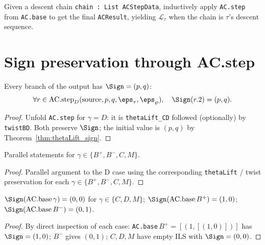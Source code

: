 \begin{definition}
  \label{def:AC_fold}
  \leanok
  Given a descent chain \texttt{chain : List ACStepData}, inductively apply
  \texttt{AC.step} from \texttt{AC.base} to get the final \texttt{ACResult},
  yielding $\mathcal{L}_\tau$ when the chain is $\tau$'s descent sequence.
\end{definition}

\section{Sign preservation through AC.step}

\begin{theorem}[AC.step preserves signature ($\gamma = D$)]
  \label{thm:AC_step_sign_D}
  \leanok
  Every branch of the output has $\Sign = (p, q)$:
  \[ \forall r \in \mathrm{AC.step}_{D}(\mathrm{source}, p, q, \eps_\tau, \eps_\wp),\quad \Sign(r.2) = (p, q). \]
\end{theorem}
\begin{proof}
  \leanok
  Unfold \texttt{AC.step} for $\gamma = D$: it is \texttt{thetaLift\_CD} followed (optionally) by \texttt{twistBD}. Both preserve $\Sign$; the initial value is $(p, q)$ by Theorem~\ref{thm:thetaLift_sign}.
\end{proof}


\begin{theorem}
  \label{thm:AC_step_sign_all}
  \leanok
  Parallel statements for $\gamma \in \{B^+, B^-, C, M\}$.
\end{theorem}
\begin{proof}
  \leanok
  Parallel argument to the D case using the corresponding \texttt{thetaLift} / twist preservation for each $\gamma \in \{B^+, B^-, C, M\}$.
\end{proof}


\begin{theorem}
  \label{thm:AC_base_sign}
  \leanok
  $\Sign(\mathrm{AC.base}\,\gamma) = (0, 0)$ for $\gamma \in \{C, D, M\}$; $\Sign(\mathrm{AC.base}\,B^+) = (1, 0)$; $\Sign(\mathrm{AC.base}\,B^-) = (0, 1)$.
\end{theorem}
\begin{proof}
  \leanok
  By direct inspection of each case: \texttt{AC.base}$\,B^+ = [(1, [(1, 0)])]$ has $\Sign = (1, 0)$; $B^-$ gives $(0, 1)$; $C, D, M$ have empty ILS with $\Sign = (0, 0)$.
\end{proof}


